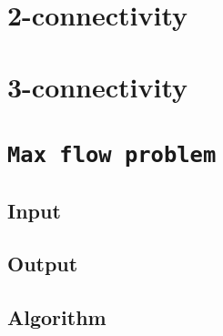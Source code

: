\section{2-connectivity}
\section{3-connectivity}
\section{\texttt{Max flow problem}}
\subsection{Input}
\subsection{Output}
\subsection{Algorithm}
